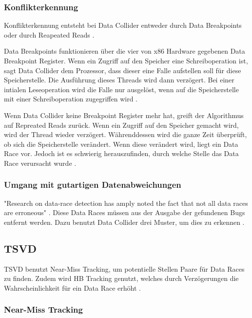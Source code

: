 \subsubsection*{Konflikterkennung}

Konflikterkennung entsteht bei Data Collider entweder durch Data Breakpoints oder durch Reapeated Reads \cite[vgl.][7]{erickson_effective_nodate}.

Data Breakpoints funktionieren über die vier von x86 Hardware gegebenen Data Breakpoint Register. Wenn ein Zugriff auf den Speicher eine Schreiboperation ist, sagt Data Collider dem Prozessor, dass dieser eine Falle aufstellen soll für diese Speicherstelle. Die Ausführung dieses Threads wird dann verzögert. Bei einer intialen Leseoperation wird die Falle nur ausgelöst, wenn auf die Speicherstelle mit einer Schreiboperation zugegriffen wird \cite[vgl.][7-8]{erickson_effective_nodate}.

Wenn Data Collider keine Breakpoint Register mehr hat, greift der Algorithmus auf Repreated Reads zurück. Wenn ein Zugriff auf den Speicher gemacht wird, wird der Thread wieder verzögert. Währenddessen wird die ganze Zeit überprüft, ob sich die Speicherstelle verändert. Wenn diese verändert wird, liegt ein Data Race vor. Jedoch ist es schwierig herauszufinden, durch welche Stelle das Data Race verursacht wurde \cite[vgl.][7-8]{erickson_effective_nodate}. 

\subsubsection*{Umgang mit gutartigen Datenabweichungen}

"Research on data-race detection has amply noted the fact that not all data races are erroneous" \cite[8]{erickson_effective_nodate}. Diese Data Races müssen aus der Ausgabe der gefundenen Bugs entfernt werden. Dazu benutzt Data Collider drei Muster, um dies zu erkennen \cite[vgl.][8]{erickson_effective_nodate}.

\subsection*{TSVD}

\ac{TSVD} benutzt Near-Miss Tracking, um potentielle Stellen Paare für Data Races zu finden. Zudem wird \acs{HB} Tracking genutzt, welches durch Verzögerungen die Wahrscheinlichkeit für ein Data Race erhöht \cite[vgl.][163]{li_efficient_2019}.

\subsubsection*{Near-Miss Tracking}

